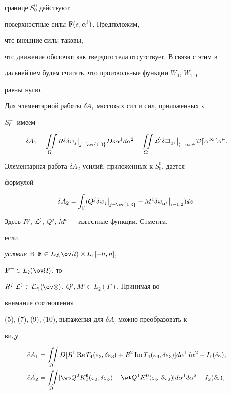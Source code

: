 границе $S^0_0$ действуют 


поверхностные силы $\bold F(s,\alpha^3)$. Предположим, 


что внешние силы таковы, 


что движение оболочки как твердого тела отсутствует. В связи с этим в 


дальнейшем будем считать, что произвольные функции $W_0$, $W_{1,0}$ 


равны нулю. 


 


Для элементарной работы $\delta A_1$ массовых сил и сил, приложенных к 


$S^\pm_0$, имеем 


$$ 


\delta A_1=\intO R^j\delta w_j\big|_{j=\ov{1,3}} 


D d\alpha^1 d\alpha^2-\intO \cal L^i\delta w_{\alpha^i} 


\big|_{i=1,2}D d\alpha^1d\alpha^2. 


$$ 


Элементарная работа $\delta A_2$ усилий, приложенных к $S^0_0$, дается 


формулой 


$$ 


\delta A_2=\int_\Gamma(Q^j\delta w_j\big|_{j=\ov{1,3}}- 


M^i\delta w_{\alpha^i}\big|_{i=1,2})ds. 


$$ 


Здесь $R^j$, $\cal L^i$, $Q^j$, $M^i$ --- известные функции. Отметим, 


если 


{\it условие}~B\; $\bold F\in L_2(\ov\Omega)\times L_1[-h,h]$, 


$\bold F^\pm\in L_2(\ov\Omega)$, то 


$R^j,\cal L^i\in L_2(\ov\Omega)$, $Q^j,M^i\in L_2(\Gamma)$. Принимая во 


внимание соотношения 


(5), (7), (9), (10), выражения для $\delta A_j$ можно преобразовать к 


виду 


\begin{align} 


\delta A_1&=\intO D[R^1\re T_4(\varepsilon_3,\delta\varepsilon_3) 


+R^2\im T_4(\varepsilon_3,\delta\varepsilon_3)] 


d\alpha^1d\alpha^2+I_1(\delta\varepsilon), \\ 


\delta A_2&=\intO[\wt Q^2K^0_2(\varepsilon_3,\delta\varepsilon_3)- 


\wt Q^1K^0_1(\varepsilon_3,\delta\varepsilon_3)] 


d\alpha^1d\alpha^2+I_2(\delta\varepsilon), 


\end{align} 


